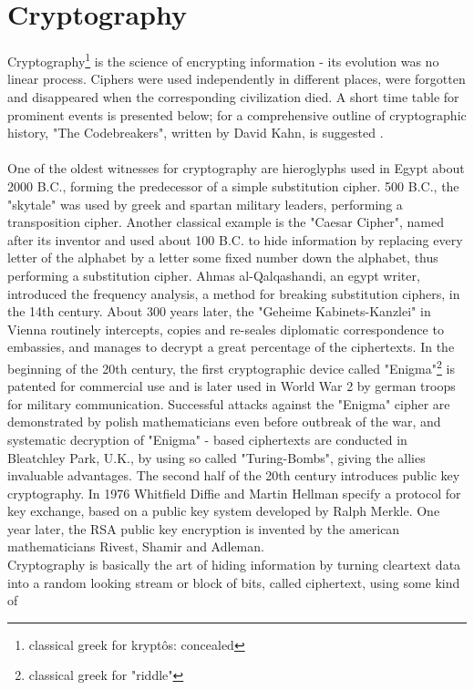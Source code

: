 \section{Cryptography}\label{sec:crypto}
Cryptography\footnote{classical greek for krypt\^{o}s: concealed}
is the science of encrypting information - its evolution was no linear process. Ciphers were used independently in different
places, were forgotten and disappeared when the corresponding civilization died.
A short time table for prominent events is presented below; for a comprehensive outline of cryptographic history, "The Codebreakers", written by David Kahn,
is suggested \cite{codebreakers}.
\\
\\
One of the oldest witnesses for cryptography are hieroglyphs used in Egypt about 2000 B.C., forming the predecessor
of a simple substitution cipher. 500 B.C., the "skytale" was used by greek and spartan military leaders, performing a transposition cipher. Another classical
example is the "Caesar Cipher", named after its inventor and used about 100 B.C. to hide information by replacing every letter of the alphabet by a letter some fixed number down the alphabet,
thus performing a substitution cipher. Ahmas al-Qalqashandi, an egypt writer, introduced the frequency analysis, a method for breaking substitution ciphers,
in the 14th century. About 300 years later, the "Geheime Kabinets-Kanzlei" in Vienna routinely intercepts, copies and 
 re-seales diplomatic correspondence to embassies, and manages to decrypt a great percentage of the ciphertexts. In the beginning of the 20th century, the 
 first cryptographic device called "Enigma"\footnote{classical greek for "riddle"} is patented for commercial use and is later used in World War 2 by german troops for 
 military communication. Successful attacks against the "Enigma" cipher are demonstrated by polish mathematicians even before outbreak of the war, and systematic
 decryption of "Enigma" - based ciphertexts are conducted in Bleatchley Park, U.K., by using so called "Turing-Bombs", giving the allies invaluable advantages.
The second half of the 20th century introduces public key cryptography. In 1976 Whitfield Diffie and Martin Hellman specify a 
protocol for key exchange, based on a public key system developed by Ralph Merkle. One year later, the RSA public key encryption is invented by the american
mathematicians Rivest, Shamir and Adleman.
\\
Cryptography is basically the art of hiding information by turning cleartext
data into a random looking stream or block of bits, called ciphertext, using some kind of
